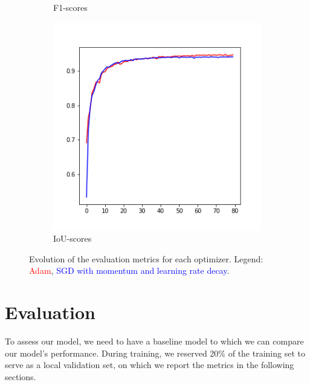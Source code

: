 \documentclass[10pt,conference,compsocconf]{IEEEtran}
\begin{document}
\begin{figure}[ht]
\begin{subfigure}{0.31\linewidth}
        \caption{F1-scores}
    \end{subfigure}
    \begin{subfigure}{0.31\linewidth}
        \centering
        \includegraphics[width=\linewidth]{doc/images/opt_iou_scores.png}
        \caption{IoU-scores}
    \end{subfigure}
    \caption{Evolution of the evaluation metrics for each optimizer. Legend: \textcolor{red}{Adam}, \textcolor{blue}{SGD with momentum and learning rate decay}.}
    \label{fig:opt_metrics}
\end{figure}

\section{Evaluation}

To assess our model, we need to have a baseline model to which we can compare our model's performance. During training, we reserved 20\% of the training set to serve as a local validation set, on which we report the metrics in the following sections.\\
\end{document}
